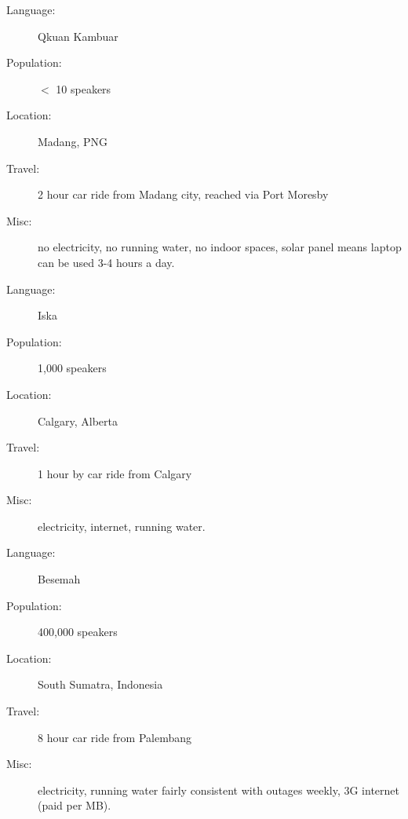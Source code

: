 \documentclass{article}
\begin{document}
\thispagestyle{empty}

%

\begin{description}
\item[Language:] Qkuan Kambuar
\item[Population:] $<$ 10 speakers
\item[Location:] Madang, PNG
\item[Travel:] 2 hour car ride from Madang city, reached via Port Moresby
\item[Misc:] no electricity, no running water, no indoor spaces, solar panel means laptop can be used 3-4 hours a day.
\end{description}

\hrulefill
\bigskip

\begin{description}
\item[Language:] Iska
\item[Population:] 1,000 speakers
\item[Location:] Calgary, Alberta 
\item[Travel:] 1 hour by car ride from Calgary 
\item[Misc:] electricity, internet, running water. 
\end{description}

\hrulefill
\bigskip

\begin{description}
\item[Language:] Besemah
\item[Population:] 400,000 speakers
\item[Location:] South Sumatra, Indonesia 
\item[Travel:] 8 hour car ride from Palembang 
\item[Misc:] electricity, running water fairly consistent with outages weekly, 3G internet (paid per MB).  
\end{description}
\end{document}
